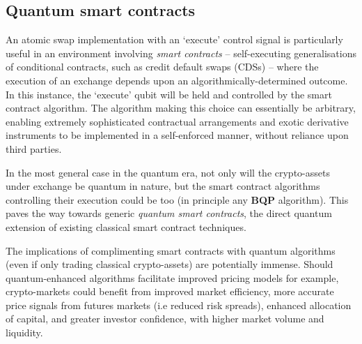 
\subsection{Quantum smart contracts}

An atomic swap implementation with an `execute' control signal is particularly useful in an environment involving \textit{smart contracts} -- self-executing generalisations of conditional contracts, such as credit default swaps (CDSs) -- where the execution of an exchange depends upon an algorithmically-determined outcome. In this instance, the `execute' qubit will be held and controlled by the smart contract algorithm. The algorithm making this choice can essentially be arbitrary, enabling extremely sophisticated contractual arrangements and exotic derivative instruments to be implemented in a self-enforced manner, without reliance upon third parties.

In the most general case in the quantum era, not only will the crypto-assets under exchange be quantum in nature, but the smart contract algorithms controlling their execution could be too (in principle any \textbf{BQP} algorithm). This paves the way towards generic \textit{quantum smart contracts}, the direct quantum extension of existing classical smart contract techniques.

The implications of complimenting smart contracts with quantum algorithms (even if only trading classical crypto-assets) are potentially immense. Should quantum-enhanced algorithms facilitate improved pricing models for example, crypto-markets could benefit from improved market efficiency, more accurate price signals from futures markets (i.e reduced risk spreads), enhanced allocation of capital, and greater investor confidence, with higher market volume and liquidity.